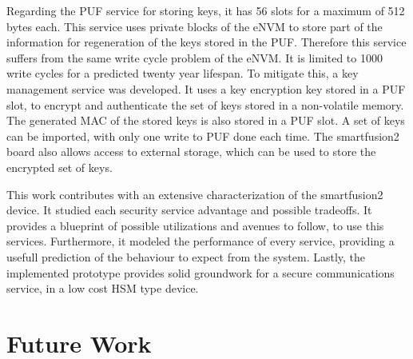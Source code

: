 Regarding the PUF service for storing keys, it has 56 slots for a maximum of 512 bytes each. This service uses private blocks of the eNVM to store part of the information for regeneration of the keys stored in the PUF. Therefore this service suffers from the same write cycle problem of the eNVM. It is limited to 1000 write cycles for a predicted twenty year lifespan. To mitigate this, a key management service was developed. It uses a key encryption key stored in a PUF slot, to encrypt and authenticate the set of keys stored in a non-volatile memory. The generated MAC of the stored keys is also stored in a PUF slot. A set of keys can be imported, with only one write to PUF done each time. The smartfusion2 board also allows access to external storage, which can be used to store the encrypted set of keys.

This work contributes with an extensive characterization of the smartfusion2 device. It studied each security service advantage and possible tradeoffs. It provides a blueprint of possible utilizations and avenues to follow, to use this services. Furthermore, it modeled the performance of every service, providing a usefull prediction of the behaviour to expect from the system. Lastly, the implemented prototype provides solid groundwork for a secure communications service, in a low cost HSM type device.

\section{Future Work} \label{chap:conclusion:future-work}

